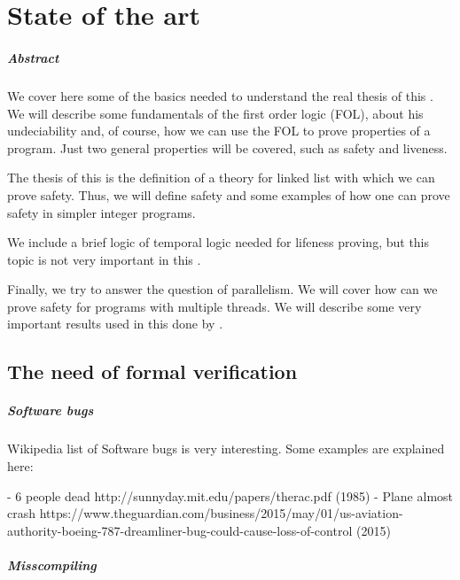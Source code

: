 \chapter{State of the art\label{sec:estado_del_arte}}

\paragraph{Abstract}

We cover here some of the basics needed to understand the real thesis of this \thisworkm. We will describe some fundamentals of the first order logic (\gls{FOL}), about his undeciability and, of course, how we can use the \gls{FOL} to prove properties of a program. Just two general properties will be covered, such as safety and liveness.

The thesis of this \thisworkm is the definition of a theory for linked list with which we can prove safety. Thus, we will define safety and some examples of how one can prove safety in simpler integer programs.

We include a brief logic of temporal logic needed for lifeness proving, but this topic is not very important in this \thisworkm.

Finally, we try to answer the question of parallelism. We will cover how can we prove safety for programs with multiple threads. We will describe some very important results used in this \thisworkm 
done by \citep{thesisAle}.

\section{The need of formal verification}

\paragraph{Software bugs}

Wikipedia list of Software bugs is very interesting. Some examples are explained here:

	- 6 people dead http://sunnyday.mit.edu/papers/therac.pdf (1985)
	- Plane almost crash https://www.theguardian.com/business/2015/may/01/us-aviation-authority-boeing-787-dreamliner-bug-could-cause-loss-of-control (2015)

\paragraph{Misscompiling}


